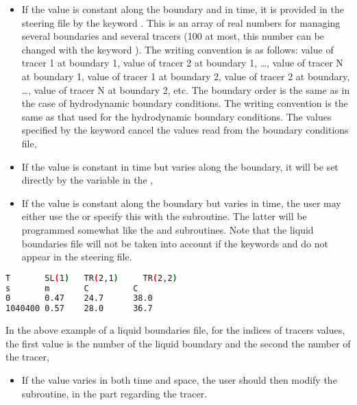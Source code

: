 \begin{itemize}
\item If the value is constant along the boundary and in time, it is provided
in the steering file by the keyword .
This is an array of real numbers for managing several boundaries and several
tracers (100 at most, this number can be changed with the keyword
).
The writing convention is as follows: value of tracer 1 at
boundary 1, value of tracer 2 at boundary 1, \dots , value of tracer N at
boundary 1, value of tracer 1 at boundary 2, value of tracer 2 at boundary,
\dots , value of tracer N at boundary 2, etc. The boundary order is the same as
in the case of hydrodynamic boundary conditions.
The writing convention is the same as that used for the hydrodynamic boundary
conditions.
The values specified by the keyword cancel the values read from the boundary
conditions file,

\item If the value is constant in time but varies along the boundary,
it will be set directly by the  variable
in the ,

\item If the value is constant along the boundary but varies in time,
the user may either use the 
or specify this with the  subroutine.
The latter will be programmed somewhat like the
 and  subroutines.
Note that the liquid boundaries file will not be taken into account
if the keywords  and  do not appear in the steering file.
\end{itemize}

\begin{lstlisting}[language=bash]
T       SL(1)   TR(2,1)     TR(2,2)
s       m       C         C
0       0.47    24.7      38.0
1040400 0.57    28.0      36.7
\end{lstlisting}

In the above example of a liquid boundaries file, for the indices of tracers
values, the first value is the number of the liquid boundary and the second the
number of the tracer,

\begin{itemize}
\item If the value varies in both time and space, the user should then modify
the  subroutine, in the part regarding the tracer.
\end{itemize}

